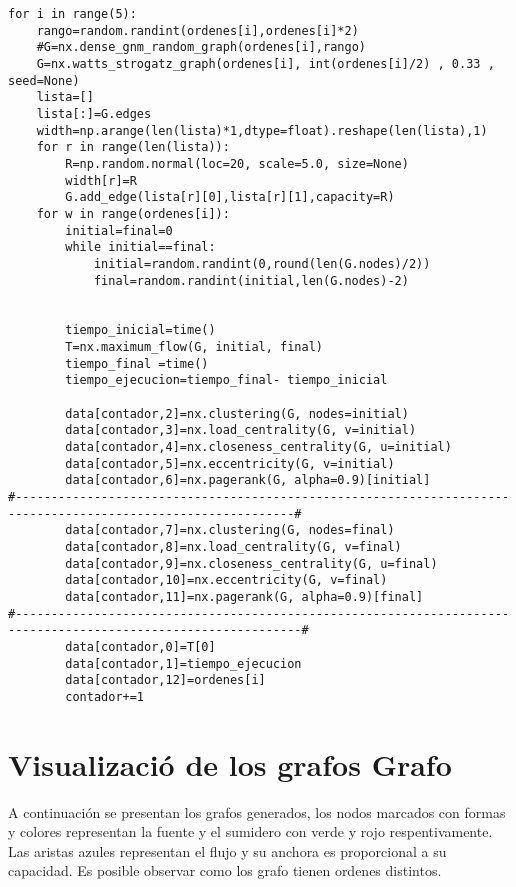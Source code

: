 \documentclass[a4paper, 11pt]{article}
\begin{document}
\begin{lstlisting}[frame=single]
for i in range(5):
    rango=random.randint(ordenes[i],ordenes[i]*2)
    #G=nx.dense_gnm_random_graph(ordenes[i],rango)
    G=nx.watts_strogatz_graph(ordenes[i], int(ordenes[i]/2) , 0.33 , seed=None)
    lista=[]
    lista[:]=G.edges
    width=np.arange(len(lista)*1,dtype=float).reshape(len(lista),1)
    for r in range(len(lista)):
        R=np.random.normal(loc=20, scale=5.0, size=None)
        width[r]=R
        G.add_edge(lista[r][0],lista[r][1],capacity=R)
    for w in range(ordenes[i]):
        initial=final=0        
        while initial==final:
            initial=random.randint(0,round(len(G.nodes)/2))
            final=random.randint(initial,len(G.nodes)-2)
            
        
        tiempo_inicial=time()
        T=nx.maximum_flow(G, initial, final)
        tiempo_final =time()
        tiempo_ejecucion=tiempo_final- tiempo_inicial
        
        data[contador,2]=nx.clustering(G, nodes=initial)
        data[contador,3]=nx.load_centrality(G, v=initial)
        data[contador,4]=nx.closeness_centrality(G, u=initial)
        data[contador,5]=nx.eccentricity(G, v=initial)
        data[contador,6]=nx.pagerank(G, alpha=0.9)[initial]
#-------------------------------------------------------------------------------------------------------------#
        data[contador,7]=nx.clustering(G, nodes=final)
        data[contador,8]=nx.load_centrality(G, v=final)
        data[contador,9]=nx.closeness_centrality(G, u=final)
        data[contador,10]=nx.eccentricity(G, v=final)
        data[contador,11]=nx.pagerank(G, alpha=0.9)[final]
#--------------------------------------------------------------------------------------------------------------#
        data[contador,0]=T[0]
        data[contador,1]=tiempo_ejecucion
        data[contador,12]=ordenes[i]
        contador+=1 
\end{lstlisting}




\section{Visualizaci\'o de los grafos Grafo }
A continuaci\'on se presentan los grafos generados, los nodos marcados con formas y colores representan la fuente y el sumidero con verde y rojo respentivamente. Las aristas azules representan el flujo y su anchora es proporcional a su capacidad. Es posible observar como los grafo tienen ordenes distintos.
\end{document}
